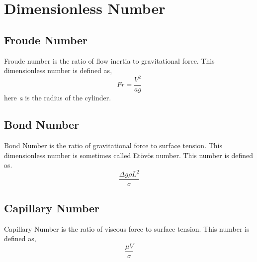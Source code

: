 \documentclass[]{jsarticle}
\begin{document}
\section{Dimensionless Number}
\subsection{Froude Number}
Froude number is the ratio of flow inertia to gravitational force. This dimensionless number is defined as,
\begin{equation}
Fr=\frac{V^2}{ag}
\end{equation}
here \textit{a} is the radius of the cylinder.
\label{subsec:label}
\subsection{Bond Number}
Bond Number is the ratio of gravitational force to surface tension. This dimensionless number is sometimes called Et\"{o}v\"{o}s number. This number is defined as.
\begin{equation}
\frac{\Delta g\rho L^2}{\sigma}
\end{equation}
\label{subsec:label}

\subsection{Capillary Number}
Capillary Number is the ratio of viscous force to surface tension. This number is defined as,
\begin{equation}
\frac{\mu V}{\sigma}
\end{equation}
\label{subsec:label}




\label{sec:label}
\end{document}
